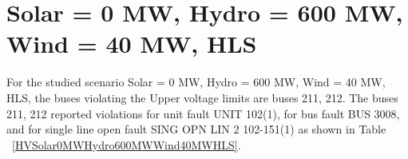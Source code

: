 \documentclass[10pt]{report}
\begin{document}
\section{Solar = 0 MW, Hydro = 600 MW, Wind = 40 MW, HLS}
For the studied scenario Solar = 0 MW, Hydro = 600 MW, Wind = 40 MW, HLS, the buses violating the Upper voltage limits are buses 211, 212.
The buses 211, 212 reported violations for unit fault UNIT 102(1), for bus fault BUS 3008, and for single line open fault SING OPN LIN   2 102-151(1) as shown in Table ~\ref{HVSolar0MWHydro600MWWind40MWHLS}.
\begin{table}[H]
\caption{Contingencies reporting bus voltages greater than emergency voltage of 1.1 PU for scenario Solar = 0 MW, Hydro = 600 MW, Wind = 40 MW, HLS}
\label{HVSolar0MWHydro600MWWind40MWHLS}
\centering
{}
\end{table}
\end{document}

